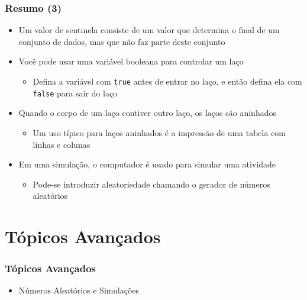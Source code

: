 \documentclass[xcolor={dvipsnames,table},aspectratio=169]{beamer}
\begin{document}
\begin{frame}\frametitle{Resumo (3)}
\begin{itemize}
	\item Um valor de sentinela consiste de um valor que determina o final de um conjunto de dados, mas que não faz parte deste conjunto
	\item Você pode usar uma variável booleana para controlar um laço
	\begin{itemize}
		\item Defina a variável com \texttt{true} antes de entrar no laço, e então defina ela com \texttt{false} para sair do laço
	\end{itemize}
	\item Quando o corpo de um laço contiver outro laço, os laços são aninhados
	\begin{itemize}
		\item Um uso típico para laços aninhados é a impressão de uma tabela com linhas e colunas
	\end{itemize}
	\item Em uma simulação, o computador é usado para simular uma atividade
	\begin{itemize}
		\item Pode-se introduzir aleatoriedade chamando o gerador de números aleatórios
	\end{itemize}
\end{itemize}
\end{frame}

\section{Tópicos Avançados}

\begin{frame}[fragile]\frametitle{Tópicos Avançados}
\begin{itemize}
	\item Números Aleatórios e Simulações
\end{itemize}
\end{frame}
\end{document}
